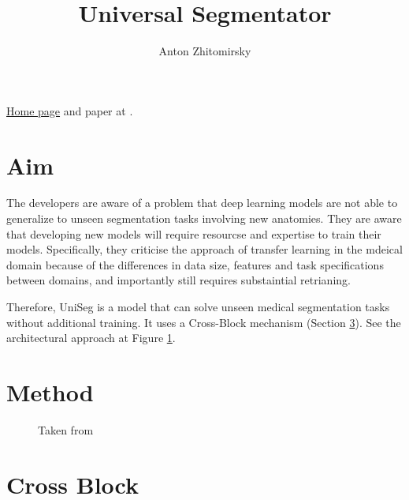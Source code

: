 \documentclass[11pt]{article}
\title{Universal Segmentator}
\author{Anton Zhitomirsky}
\begin{document}
\maketitle

\href{https://universeg.csail.mit.edu/}{Home page} and paper at \cite{universeg}.

\section{Aim}

The developers are aware of a problem that deep learning models are not able to generalize to unseen segmentation tasks involving new anatomies. They are aware that developing new models will require resourcse and expertise to train their models. Specifically, they criticise the approach of transfer learning in the mdeical domain because of the differences in data size, features and task specifications between domains, and importantly still requires substaintial retrianing. 

\vspace{1em}

Therefore, UniSeg is a model that can solve unseen medical segmentation tasks without additional training. It uses a Cross-Block mechanism (Section \ref{sec:cross-block}). See the architectural approach at Figure \ref{fig:arch-comparison}.

\section{Method}

\begin{figure}[H]
    \centering
    \caption{Taken from \cite{universeg}}\label{fig:arch-comparison}
\end{figure}




\section{Cross Block} \label{sec:cross-block}

\printbibliography
\end{document}

